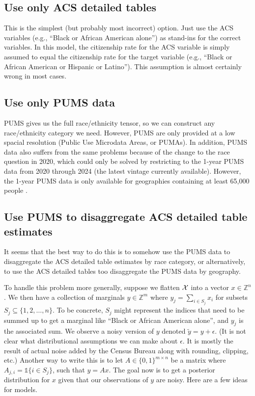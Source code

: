 \documentclass[12pt]{article}
\begin{document}
\subsection{Use only ACS detailed tables}
This is the simplest (but probably most incorrect) option. Just use the ACS variables (e.g., ``Black or African American alone'') as stand-ins for the correct variables. In this model, the citizenship rate for the ACS variable is simply assumed to equal the citizenship rate for the target variable (e.g., ``Black or African American or Hispanic or Latino''). This assumption is almost certainly wrong in most cases.

\subsection{Use only PUMS data}
PUMS gives us the full race/ethnicity tensor, so we can construct any race/ethnicity category we need. However, PUMS are only provided at a low spacial resolution (Public Use Microdata Areas, or PUMAs). In addition, PUMS data also suffers from the same problems because of the change to the race question in 2020, which could only be solved by restricting to the 1-year PUMS data from 2020 through 2024 (the latest vintage currently available). However, the 1-year PUMS data is only available for geographies containing at least 65,000 people \citep{pums_data_release_rules}.

\subsection{Use PUMS to disaggregate ACS detailed table estimates}
It seems that the best way to do this is to somehow use the PUMS data to disaggregate the ACS detailed table estimates by race category, or alternatively, to use the ACS detailed tables too disaggregate the PUMS data by geography.

To handle this problem more generally, suppose we flatten $\mathcal{X}$ into a vector $x \in \mathbb{Z}^n$. We then have a collection of marginals $y \in \mathbb{Z}^m$ where $y_j = \sum_{i \in S_j} x_i$ for subsets $S_j \subseteq \{1,2,\dots,n\}$. To be concrete, $S_j$ might represent the indices that need to be summed up to get a marginal like ``Black or African American alone'', and $y_j$ is the associated sum. We observe a noisy version of $y$ denoted $\tilde{y} = y + \epsilon$. (It is not clear what distributional assumptions we can make about $\epsilon$. It is mostly the result of actual noise added by the Census Bureau along with rounding, clipping, etc.) Another way to write this is to let $A \in \{0,1\}^{m \times n}$ be a matrix where $A_{j,i} = \mathbb{1}\{i \in S_j\}$, such that $y = Ax$. The goal now is to get a posterior distribution for $x$ given that our observations of $y$ are noisy. Here are a few ideas for models.
\end{document}
